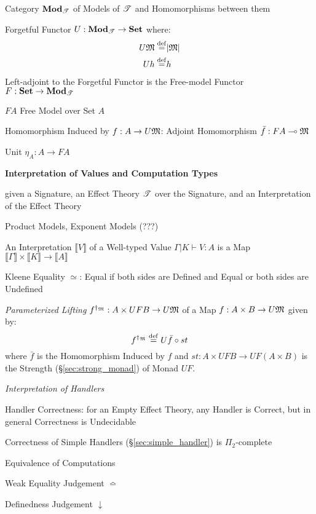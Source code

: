 Category $\mathbf{Mod}_\mathscr{T}$ of Models of $\mathscr{T}$ and Homomorphisms
between them

Forgetful Functor $U : \mathbf{Mod}_\mathscr{T} \rightarrow \mathbf{Set}$ where:
\[
  \begin{split}
    U \mathfrak{M} \stackrel{\mathrm{def}}= & |\mathfrak{M}| \\
    U h \stackrel{\mathrm{def}}= & h
  \end{split}
\]
Left-adjoint to the Forgetful Functor is the Free-model Functor $F :
\mathbf{Set} \rightarrow \mathbf{Mod}_\mathscr{T}$

$F A$ Free Model over Set $A$

Homomorphism Induced by $f : A \rightarrow U \mathfrak{M}$: Adjoint
Homomorphism $\bar{f} : F A \multimap \mathfrak{M}$

Unit $\eta_A : A \rightarrow F A$


\textbf{Interpretation of Values and Computation Types}

given a Signature, an Effect Theory $\mathscr{T}$ over the Signature, and
an Interpretation of the Effect Theory

Product Models, Exponent Models (???) %

An Interpretation $\llbracket V \rrbracket$ of a Well-typed Value
$\Gamma | K \vdash V:A$ is a Map $\llbracket \Gamma \rrbracket \times
\llbracket K \rrbracket \rightarrow \llbracket A \rrbracket$

Kleene Equality $\simeq$: Equal if both sides are Defined and Equal or
both sides are Undefined %

\emph{Parameterized Lifting} $f^{\dagger_\mathfrak{M}} : A
\times U F B \rightarrow U \mathfrak{M}$ of a Map $f : A \times B
\rightarrow U \mathfrak{M}$ given by:
\[
  f^{\dagger_\mathfrak{M}} \stackrel{\mathrm{def}}= U \bar{f} \circ st
\]
where $\bar{f}$ is the Homomorphism Induced by $f$ and $st : A \times
U F B \rightarrow U F (A \times B)$ is the Strength
(\S\ref{sec:strong_monad}) of Monad $U F$.


\emph{Interpretation of Handlers}

Handler Correctness: for an Empty Effect Theory, any Handler is
Correct, but in general Correctness is Undecidable

Correctness of Simple Handlers (\S\ref{sec:simple_handler}) is
$\Pi_2$-complete %


\asterism


Equivalence of Computations

Weak Equality Judgement $\bumpeq$

Definedness Judgement $\downarrow$


